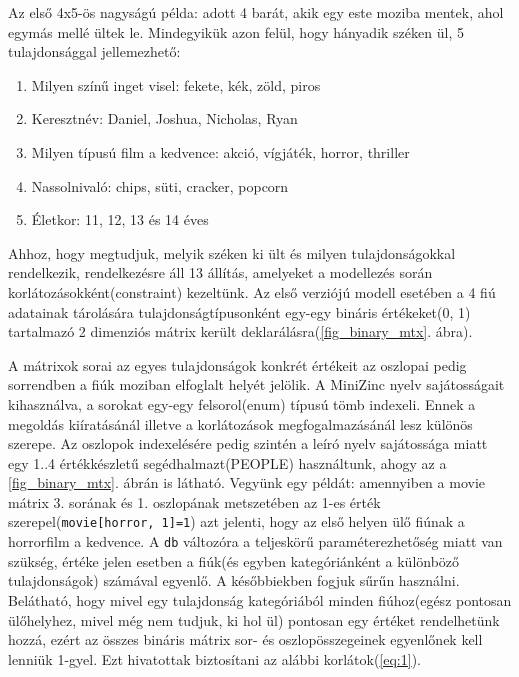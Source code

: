 \documentclass[12pt,a4paper,twoside, openright]{report}
\begin{document}
    Az első 4x5-ös nagyságú példa: adott 4 barát, akik egy este moziba mentek, ahol egymás mellé ültek le.
    Mindegyikük azon felül, hogy hányadik széken ül, 5 tulajdonsággal jellemezhető:
    \begin{enumerate}
    	\item Milyen színű inget visel: fekete, kék, zöld, piros
    	\item Keresztnév: Daniel, Joshua, Nicholas, Ryan
    	\item Milyen típusú film a kedvence: akció, vígjáték, horror, thriller
    	\item Nassolnivaló: chips, süti, cracker, popcorn
    	\item Életkor: 11, 12, 13 és 14 éves
    \end{enumerate}
    Ahhoz, hogy megtudjuk, melyik széken ki ült és milyen tulajdonságokkal rendelkezik, rendelkezésre áll 13 állítás, amelyeket a modellezés során korlátozásokként(constraint) kezeltünk.
    Az első verziójú modell esetében a 4 fiú adatainak tárolására tulajdonságtípusonként egy-egy bináris értékeket(0, 1) tartalmazó 2 dimenziós mátrix került deklarálásra(\ref{fig_binary_mtx}. ábra).


    A mátrixok sorai az egyes tulajdonságok konkrét értékeit az oszlopai pedig sorrendben a fiúk moziban elfoglalt helyét jelölik.
    A MiniZinc nyelv sajátosságait kihasználva, a sorokat egy-egy felsorol(enum) típusú tömb indexeli.
    Ennek a megoldás kiíratásánál illetve a korlátozások megfogalmazásánál lesz különös szerepe.
    Az oszlopok indexelésére pedig szintén a leíró nyelv sajátossága miatt egy {1..4} értékkészletű segédhalmazt(PEOPLE) használtunk, ahogy az a \ref{fig_binary_mtx}. ábrán is látható.
    Vegyünk egy példát: amennyiben a movie mátrix 3. sorának és 1. oszlopának metszetében az 1-es érték szerepel(\texttt{movie[horror, 1]=1}) azt jelenti, hogy az első helyen ülő fiúnak a horrorfilm a kedvence.
    A \texttt{db} változóra a teljeskörű paraméterezhetőség miatt van szükség, értéke jelen esetben a fiúk(és egyben kategóriánként a különböző tulajdonságok) számával egyenlő. A későbbiekben fogjuk sűrűn használni.
    Belátható, hogy mivel egy tulajdonság kategóriából minden fiúhoz(egész pontosan ülőhelyhez, mivel még nem tudjuk, ki hol ül) pontosan egy értéket rendelhetünk hozzá, ezért az összes bináris mátrix sor- és oszlopösszegeinek egyenlőnek kell lenniük 1-gyel.
    Ezt hivatottak biztosítani az alábbi korlátok(\ref{eq:1}).
\end{document}
